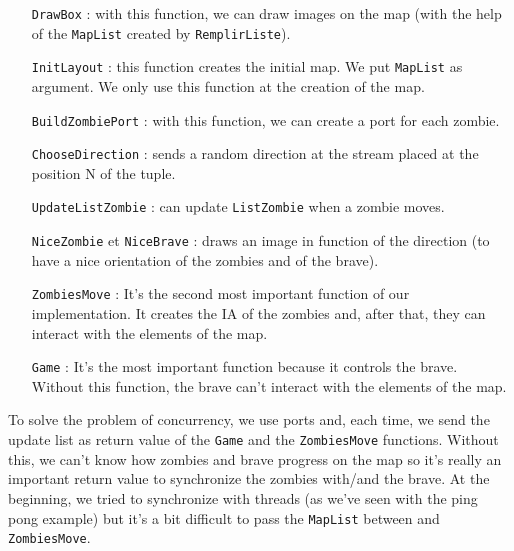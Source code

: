 \begin{itemize}
\item[\texttt{DrawBox} :] with this function, we can draw images on the map (with the help of the \texttt{MapList} created by \texttt{RemplirListe}).
\\

\item[\texttt{InitLayout} :] this function creates the initial map. We put \texttt{MapList} as argument. We only use this function at the creation of the map.
\\

\item[\texttt{BuildZombiePort} :] with this function, we can create a port for each zombie.
\\

\item[\texttt{ChooseDirection} :] sends a random direction at the stream placed at the position N of the tuple.
\\

\item[\texttt{UpdateListZombie} :] can update \texttt{ListZombie} when a zombie moves.
\\

\item[\texttt{NiceZombie} et \texttt{NiceBrave} :] draws an image in function of the direction (to have a nice orientation of the zombies and of the brave).
\\

\item[\texttt{ZombiesMove} :] It's the second most important function of our implementation. It creates the IA of the zombies and, after that, they can interact with the elements of the map.
\\

\item[\texttt{Game} :] It's the most important function because it controls the brave. Without this function, the brave can't interact with the elements of the map.
\\

\end{itemize}
To solve the problem of concurrency, we use ports and, each time, we send the update list as return value of the \texttt{Game} and the \texttt{ZombiesMove} functions. Without this, we can't know how zombies and brave progress on the map so it's really an important return value to synchronize the zombies with/and the brave. At the beginning, we tried to synchronize with threads (as we've seen with the ping pong example) but it's a bit difficult to pass the \texttt{MapList} between  and \texttt{ZombiesMove}.\\

